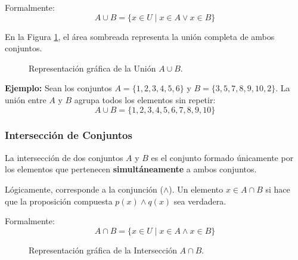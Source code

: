 Formalmente:
\[ A \cup B = \{ x \in U \mid x \in A \lor x \in B \} \]

En la Figura \ref{fig:union}, el área sombreada representa la unión completa de ambos conjuntos.

\begin{figure}[ht]
\centering
{}
\caption{Representación gráfica de la Unión $A \cup B$.}\label{fig:union}
\end{figure}

\noindent \textbf{Ejemplo:}
Sean los conjuntos $A=\{1,2,3,4,5,6\}$ y $B=\{3,5,7,8,9,10,2\}$.
La unión entre $A$ y $B$ agrupa todos los elementos sin repetir:
\[ A\cup B=\{1,2,3,4,5,6,7,8,9,10\} \]

\vspace{0.5cm}

\subsubsection{Intersección de Conjuntos}

La intersección de dos conjuntos $A$ y $B$ es el conjunto formado únicamente por los elementos que pertenecen \textbf{simultáneamente} a ambos conjuntos.

Lógicamente, corresponde a la conjunción ($\land$). Un elemento $x \in A \cap B$ si hace que la proposición compuesta $p(x) \land q(x)$ sea verdadera.

Formalmente:
\[ A \cap B = \{ x \in U \mid x \in A \land x \in B \} \]

\begin{figure}[ht]
\centering
{}
\caption{Representación gráfica de la Intersección $A \cap B$.}\label{fig:interseccion}
\end{figure}

